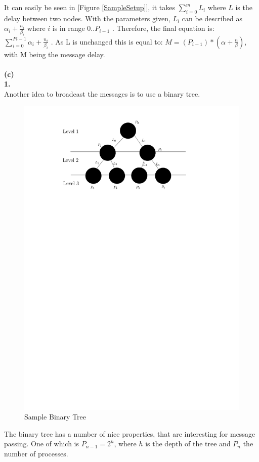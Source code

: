 \documentclass[a4paper,twoside,11pt]{article}
\begin{document}
It can easily be seen in [Figure \ref{SampleSetup}], it takes $\sum\limits_{i=0}^m L_i$ where $L$ is the delay between two nodes.
With the parameters given, $L_i$ can be described as $\alpha_i + \frac{n_i}{\beta_i}$ where $i$ is in range $0 .. P_{i-1}$ .
Therefore, the final equation is: $\sum\limits_{i=0}^{Pi-1} \alpha_i + \frac{n_i}{\beta_i}$ .
As L is unchanged this is equal to: $M = (P_{i-1}) * (\alpha + \frac{n}{\beta})$, with M being the message delay.
\\\\
\textbf{(c)\\ 1.}\hspace{1em}\\Another idea to broadcast the messages is to use a binary tree.
\begin{figure}[!htbp]
    \begin{center}
        \includegraphics[scale=1]{3c_1.pdf}
    \end{center}
    \caption{Sample Binary Tree}
    \label{BinTree}
\end{figure}
The binary tree has a number of nice properties, that are interesting for message passing.
One of which is $P_{n-1}=2^h$, where  $h$ is the depth of the tree and $P_n$ the number of processes.
\end{document}
